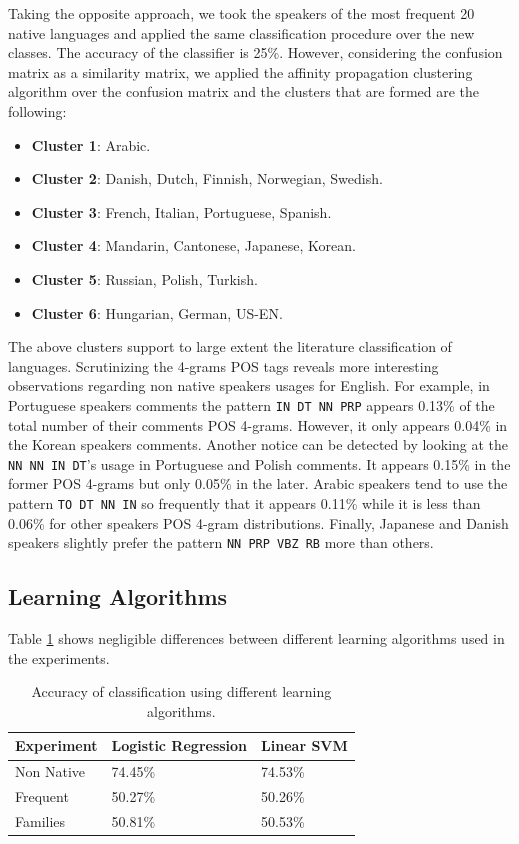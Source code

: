 \documentclass[11pt]{article}
\begin{document}
Taking the opposite approach, we took the speakers of the most frequent 20
native languages and applied the same classification procedure over the new
classes. The accuracy of the classifier is 25\%. However, considering the
confusion matrix as a similarity matrix, we applied the affinity propagation
clustering algorithm\cite{sklearn} over the confusion matrix and the clusters that are formed are the following:
\begin{itemize}
\item \textbf{Cluster 1}: Arabic.
\item \textbf{Cluster 2}: Danish, Dutch, Finnish, Norwegian, Swedish.
\item \textbf{Cluster 3}: French, Italian, Portuguese, Spanish.
\item \textbf{Cluster 4}: Mandarin, Cantonese, Japanese, Korean.
\item \textbf{Cluster 5}: Russian, Polish, Turkish.
\item \textbf{Cluster 6}: Hungarian, German, US-EN.
\end{itemize}

The above clusters support to large extent the literature classification of
languages. Scrutinizing the 4-grams POS tags reveals more interesting
observations regarding non native speakers usages for English. For example,
in Portuguese speakers comments the pattern \verb+IN DT NN PRP+ appears 0.13\%
of the total number of their comments POS 4-grams. However, it only appears
0.04\% in the Korean speakers comments. Another notice can be detected by
looking at the \verb+NN NN IN DT+'s usage in Portuguese and Polish comments. It
appears 0.15\% in the former POS 4-grams but only 0.05\% in the later. Arabic
speakers tend to use the pattern \verb+TO DT NN IN+ so frequently that it
appears 0.11\% while it is less than 0.06\% for other speakers POS 4-gram
distributions. Finally, Japanese and Danish speakers slightly prefer the pattern
\verb+NN PRP VBZ RB+ more than others.

\subsection{Learning Algorithms}

Table \ref{table:results} shows negligible differences between different learning algorithms used in the experiments. 

\begin{table}[htp]
\begin{tabular}{l|ll}
	Experiment & Logistic Regression & Linear SVM
	\\\hline
	Non Native & 74.45\% & 74.53\%\\
	Frequent & 50.27\% & 50.26\%\\
	Families & 50.81\% &50.53\% \\
\end{tabular}
\caption{Accuracy of classification using different learning algorithms.}
\label{table:results}
\end{table}
\end{document}
